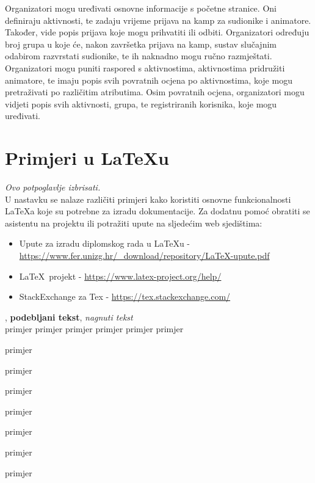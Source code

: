 		Organizatori mogu uređivati osnovne informacije s početne stranice. Oni definiraju aktivnosti, te zadaju vrijeme prijava na kamp za sudionike i animatore. Također, vide popis prijava koje mogu prihvatiti ili odbiti. Organizatori određuju broj grupa u koje će, nakon završetka prijava na kamp, sustav slučajnim odabirom razvrstati sudionike, te ih naknadno mogu ručno razmještati. Organizatori mogu puniti raspored s aktivnostima, aktivnostima pridružiti animatore, te imaju popis svih povratnih ocjena po aktivnostima, koje mogu pretraživati po različitim atributima. Osim povratnih ocjena, organizatori mogu vidjeti popis svih aktivnosti, grupa, te registriranih korisnika, koje mogu uređivati.  
		
		
		\eject
		
		\section{Primjeri u \LaTeX u}
		
		\textit{Ovo potpoglavlje izbrisati.}\\

		U nastavku se nalaze različiti primjeri kako koristiti osnovne funkcionalnosti \LaTeX a koje su potrebne za izradu dokumentacije. Za dodatnu pomoć obratiti se asistentu na projektu ili potražiti upute na sljedećim web sjedištima:
		\begin{itemize}
			\item Upute za izradu diplomskog rada u \LaTeX u - \url{https://www.fer.unizg.hr/_download/repository/LaTeX-upute.pdf}
			\item \LaTeX\ projekt - \url{https://www.latex-project.org/help/}
			\item StackExchange za Tex - \url{https://tex.stackexchange.com/}\\
		
		\end{itemize} 	


		
		\noindent {}, \textbf{podebljani tekst}, 	\textit{nagnuti tekst}\\
		\noindent \normalsize primjer \large primjer \Large primjer \LARGE {primjer} \huge {primjer} \Huge primjer \normalsize
				
		\begin{packed_item}
			
			\item  primjer
			\item  primjer
			\item  primjer
			\item[] \begin{packed_enum}
				\item primjer
				\item[] \begin{packed_enum}
					\item[1.a] primjer
					\item[b] primjer
				\end{packed_enum}
				\item primjer
			\end{packed_enum}
			
		\end{packed_item}
		
